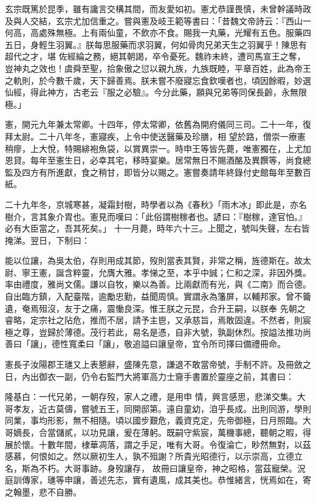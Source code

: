 \begin{pinyinscope}
 玄宗既篤於昆季，雖有讒言交構其間，而友愛如初。憲尤恭謹畏慎，未曾幹議時政及與人交結，玄宗尤加信重之。嘗與憲及岐王範等書曰：「昔魏文帝詩云：『西山一何高，高處殊無極。上有兩仙童，不飲亦不食。賜我一丸藥，光耀有五色。服藥四五日，身輕生羽翼。』朕每思服藥而求羽翼，何如骨肉兄弟天生之羽翼乎！陳思有超代之才，堪
 佐經綸之務，絕其朝謁，卒令憂死。魏祚未終，遭司馬宣王之奪，豈神丸之效也！虞舜至聖，拾象傲之愆以親九族，九族既睦，平章百姓，此為帝王之軌則，於今數千歲，天下歸善焉。朕未嘗不廢寢忘食欽嘆者也，頃因餘暇，妙選仙經，得此神方，古老云『服之必驗』。今分此藥，願與兄弟等同保長齡，永無限極。」



 憲，開元九年兼太常卿。十四年，停太常卿，依舊為開府儀同三司。二十一年，復拜太尉。二十八年冬，憲寢疾，上令中使送醫藥及珍膳，相
 望於路，僧崇一療憲稍瘳，上大悅，特賜緋袍魚袋，以賞異崇一。時申王等皆先薨，唯憲獨在，上尤加恩貸。每年至憲生日，必幸其宅，移時宴樂。居常無日不賜酒酪及異饌等，尚食總監及四方有所進獻，食之稍甘，即皆分以賜之。憲嘗奏請年終錄付史館每年至數百紙。



 二十九年冬，京城寒甚，凝霜封樹，時學者以為《春秋》「雨木冰」即此是，亦名樹介，言其象介胄也。憲見而嘆曰：「此俗謂樹稼者也。諺曰：『樹稼，達官怕。』必有大臣當之，吾其死矣。」
 十一月薨，時年六十三。上聞之，號叫失聲，左右皆掩涕。翌日，下制曰：



 能以位讓，為吳太伯，存則用成其節，歿則當表其賢，非常之稱，旌德斯在。故太尉、寧王憲，誕含粹靈，允膺大雅。孝悌之至，本乎中誠；仁和之深，非因外獎。率由禮度，雅尚文儒。謙以自牧，樂以為善。比兩獻而有光，與《二南》而合德。自出臨方鎮，入配臺階，逾勵忠勤，益聞周慎。實謂永為籓屏，以輔邦家。曾不籥遺，奄焉殂沒，友于之痛，震慟良深。惟王朕之元昆，合升王嗣，以朕奉
 先朝之睿略，定宗社之阽危，推而不居，請予主鬯，又承慈旨，焉敢固違。不然者，則宸極之尊，豈歸於薄德。茂行若此，易名是憑，自非大號，孰副休烈。按謚法推功尚善曰「讓」，德性寬柔曰「讓」，敬追謚曰讓皇帝，宜令所司擇曰備禮冊命。



 憲長子汝陽郡王璡又上表懇辭，盛陳先意，謙退不敢當帝號，手制不許。及冊斂之日，內出御衣一副，仍令右監門大將軍高力士齎手書置於靈座之前，其書曰：



 隆基白：一代兄弟，一朝存歿，家人之禮，是用申
 情，興言感思，悲涕交集。大哥孝友，近古莫儔，嘗號五王，同開邸第。遠自童幼，洎乎長成。出則同游，學則同業，事均形影，無不相隨。頃以國步艱危，義資克定，先帝御極，日月照臨。大哥嫡長，合當儲貳，以功見讓，爰在薄躬。既嗣守紫宸，萬機事總，聽朝之暇，得展於懷。十數年間，棣華凋落，謂之手足，唯有大哥。令復淪亡，眇然無對，以茲感慕，何恨如之。然以厥初生人，孰不殂謝？所貴光昭德行，以示崇高，立德立名，斯為不朽。大哥事跡。身歿讓存，
 故冊曰讓皇帝，神之昭格，當茲寵榮。況庭訓傳家，璡等申讓，善述先志，實有遺風，成其美也。恭惟緒言，恍焉如在，寄之翰墨，悲不自勝。




\end{pinyinscope}
